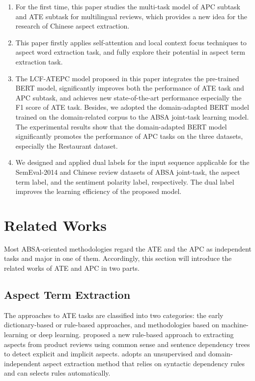 \documentclass[a4paper,fleqn]{cas-sc}
\begin{document}
\begin{enumerate}
	
	\item For the first time, this paper studies the multi-task model of APC subtask and ATE subtask for multilingual reviews, which provides a new idea for the research of Chinese aspect extraction. 
	
	\item This paper firstly applies self-attention and local context focus techniques to aspect word extraction task, and fully explore their potential in aspect term extraction task.
	
	\item The LCF-ATEPC model proposed in this paper integrates the pre-trained BERT model, significantly improves both the performance of ATE task and APC subtask, and achieves new state-of-the-art performance especially the F1 score of ATE task. Besides, we adopted the domain-adapted BERT model trained on the domain-related corpus to the ABSA joint-task learning model. The experimental results show that the domain-adapted BERT model significantly promotes the performance of APC tasks on the three datasets, especially the Restaurant dataset.
	
	\item We designed and applied dual labels for the input sequence applicable for the SemEval-2014 and Chinese review datasets of ABSA joint-task, the aspect term label, and the sentiment polarity label, respectively. The dual label improves the learning efficiency of the proposed model.
	
\end{enumerate}

\section{Related Works}

Most ABSA-oriented methodologies regard the ATE and the APC as independent tasks and major in one of them. Accordingly, this section will introduce the related works of ATE and APC in two parts.

\subsection{Aspect Term Extraction}

The approaches to ATE tasks are classified into two categories: the early dictionary-based or rule-based approaches, and methodologies based on machine-learning or deep learning. 
 proposed a new rule-based approach to extracting aspects from product reviews using common sense and sentence dependency trees to detect explicit and implicit aspects. 
 adopts an unsupervised and domain-independent aspect extraction method that relies on syntactic dependency rules and can selects rules automatically.
\end{document}
